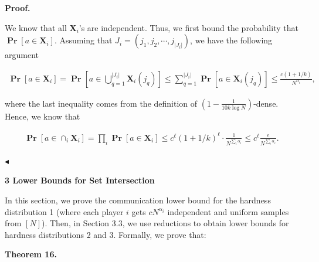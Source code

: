 \documentclass[10pt,a4paper]{article}
\begin{document}
\par\medskip\noindent\textbf{Proof.}\par




We know that all $\bm{X}_{i}$’s are independent. Thus, we first bound the probability that $\operatorname*{\mathbf{Pr}}[a\in\bm{X}_{i}]$. Assuming that $J_{i}=(j_{1},j_{2},\cdots,j_{|J_{i}|})$,
we have the following argument\par


\[\begin{gathered}
\operatorname*{\mathbf{Pr}}[a\in\bm{X}_{i}]=\operatorname*{\mathbf{Pr}}[a\in\bigcup_{q=1}^{|J_{i}|}\bm{X}_{i}(j_{q})]\leq\sum_{q=1}^{|J_{i}|}\operatorname*{\mathbf{Pr}}[a\in\bm{X}_{i}(j_{q})]\leq\frac{c(1+1/k)}{N^{\alpha_{i}}},
\end{gathered}\]


where the last inequality comes from the definition of $(1-\frac{1}{10k\log N})$-dense. Hence, we know that\par


\[\begin{gathered}
\operatorname*{\mathbf{Pr}}[a\in\cap_{i}\bm{X}_{i}]=\prod_{i}\operatorname*{\mathbf{Pr}}[a\in\bm{X}_{i}]\leq c^{\ell}(1+1/k)^{\ell}\cdot\frac{1}{N^{\sum_{i}\alpha_{i}}}\leq c^{\ell}\frac{e}{N^{\sum_{i}\alpha_{i}}}.\
\end{gathered}\]


$\blacktriangleleft$\par







\par\medskip\noindent\textbf{
3 Lower Bounds for Set Intersection}\par




In this section, we prove the communication lower bound for the hardness distribution 1 (where each player $i$ gets $cN^{\alpha_{i}}$ independent and uniform samples from $[N]$). Then, in Section 3.3, we use reductions to obtain lower bounds for hardness distributions 2 and 3. Formally, we prove that:\par





\par\medskip\noindent\textbf{
\textbf{Theorem 16}\textbf{.}
}\par
\end{document}
